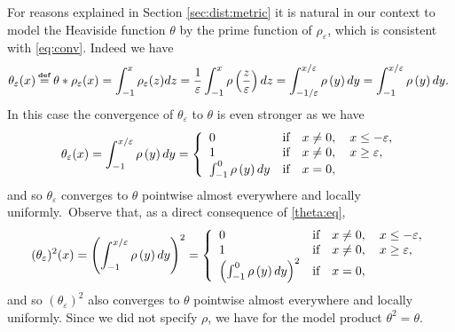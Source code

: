 \documentclass[11pt]{article}
\numberwithin{equation}{section}
\def\defi{{\stackrel{\mbox{\tiny {\textbf{def}}}}{\,\, = \,\, }}}
\def\defi{{\stackrel{\mbox{\tiny \textup{\textbf{def}}}}{\,\, = \,\, }}}
\newcommand{\eps}{\varepsilon}
\newcommand{\lp}{\left(}
\newcommand{\rp}{\right)}
\newcommand{\lb}{\left\lbrace}
\newcommand{\rd}{\right.}
\begin{document}
For reasons explained in Section \ref{sec:dist:metric} it is natural in our context to model the Heaviside function $\theta$ by the prime function of $\rho_\eps$, which is consistent with \eqref{eq:conv}. Indeed we have 
\begin{align}
\theta_{\eps}(x)\defi \theta*\rho_\eps(x)=  \int_{-1}^x\rho_{\eps}(z)dz=\frac{1}{\eps}\int_{-1}^x\rho\lp\frac{z}{\eps}\rp dz=\int_{-1/\eps}^{x/\eps}\rho\lp y\rp  dy=\int_{-1}^{x/\eps}\rho\lp y\rp  dy.\ 
\end{align}
In this case the convergence of $\theta_\eps$ to $\theta$ is even stronger as we have 
\begin{align}
\label{theta:eq}\theta_{\eps}(x)=\int_{-1}^{x/\eps}\rho\lp y\rp  dy=\lb 
\begin{array}{lll}
0 & \textup{if} & x\neq0,\quad x\leq -\eps,\\
1 & \textup{if} & x\neq0,\quad x\geq \eps, \\
\int_{-1}^{0}\rho\lp y\rp  dy & \textup{if} & x=0,
\end{array}\rd
\end{align}
and so $\theta_{\eps}$ converges to $\theta$ pointwise almost everywhere and locally uniformly.\ Observe that, as a direct consequence of \eqref{theta:eq},  
\begin{align}
(\theta_{\eps})^2(x)=\lp\int_{-1}^{x/\eps}\rho\lp y\rp  dy\rp^2=\lb 
\begin{array}{lll}
	0 & \textup{if} & x\neq0,\quad x\leq -\eps,\\
	1 & \textup{if} & x\neq0,\quad x\geq \eps, \\
	\lp \int_{-1}^{0}\rho\lp y\rp  dy\rp^2 & \textup{if} & x=0,
\end{array}\rd
\end{align}
and so $(\theta_{\eps})^2$ also converges to $\theta$ pointwise almost everywhere and locally uniformly. Since we did not specify $\rho$, we have for the model product
$\theta^2=\theta$.
\end{document}
